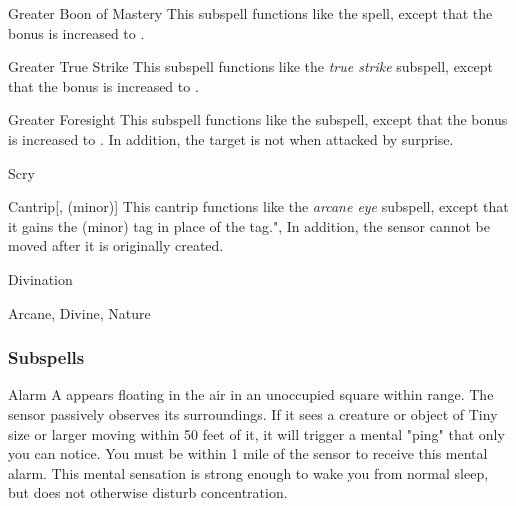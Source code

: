 \begin{ability}[\nth{6}]{Greater Boon of Mastery}
This subspell functions like the  spell, except that the bonus is increased to .
\end{ability}
\vspace{0.25em}


\begin{ability}[\nth{6}]{Greater True Strike}
This subspell functions like the \textit{true strike} subspell, except that the bonus is increased to .
\end{ability}
\vspace{0.25em}


\begin{ability}[\nth{7}]{Greater Foresight}
This subspell functions like the  subspell, except that the bonus is increased to .
In addition, the target is not  when attacked by surprise.
\end{ability}
\vspace{0.25em}

\newpage
\begin{spellsection}{Scry}

\begin{spellheader}
\end{spellheader}


\begin{ability}{Cantrip}[,  (minor)]
This cantrip functions like the \textit{arcane eye} subspell, except that it gains the  (minor) tag in place of the  tag.",
In addition, the sensor cannot be moved after it is originally created.
\end{ability}




 Divination

 Arcane, Divine, Nature
\end{spellsection}


\subsubsection{Subspells}


\begin{ability}[\nth{1}]{Alarm}
A  appears floating in the air in an unoccupied square within \rngmed range.
The sensor passively observes its surroundings.
If it sees a creature or object of Tiny size or larger moving within 50 feet of it, it will trigger a mental "ping" that only you can notice.
You must be within 1 mile of the sensor to receive this mental alarm.
This mental sensation is strong enough to wake you from normal sleep, but does not otherwise disturb concentration.
\end{ability}
\vspace{0.25em}


